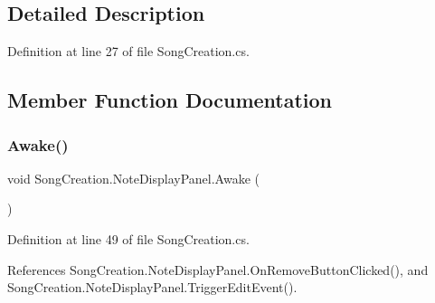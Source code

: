 \subsection{Detailed Description}


Definition at line 27 of file Song\+Creation.\+cs.



\subsection{Member Function Documentation}
\mbox{\label{class_song_creation_1_1_note_display_panel_a2f5eee7e81aa047949e69be9f0877a67}} 
\subsubsection{\texorpdfstring{Awake()}{Awake()}}
{\footnotesize\ttfamily void Song\+Creation.\+Note\+Display\+Panel.\+Awake (\begin{DoxyParamCaption}{ }\end{DoxyParamCaption})\hspace{0.3cm}{\ttfamily [private]}}



Definition at line 49 of file Song\+Creation.\+cs.



References Song\+Creation.\+Note\+Display\+Panel.\+On\+Remove\+Button\+Clicked(), and Song\+Creation.\+Note\+Display\+Panel.\+Trigger\+Edit\+Event().


